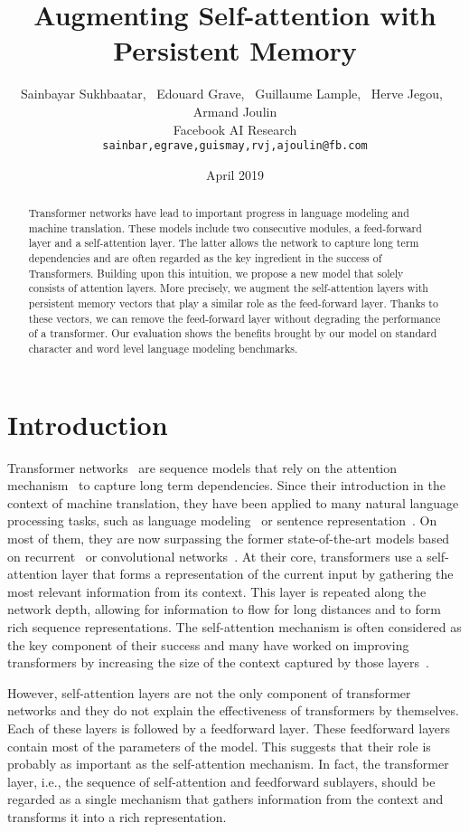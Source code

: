 \documentclass{article}
\title{Augmenting Self-attention with Persistent Memory}
\author{Sainbayar Sukhbaatar,~ Edouard Grave,~ Guillaume Lample,~ Herve Jegou,~ Armand Joulin\\
Facebook AI Research\\
\texttt{sainbar,egrave,guismay,rvj,ajoulin@fb.com}}
\date{April 2019}
\begin{document}
\maketitle

\begin{abstract}
Transformer networks have lead to important progress in language modeling and machine translation. These models include two consecutive modules, a feed-forward layer and a self-attention layer. The latter allows the network to capture long term dependencies and are often regarded as the key ingredient in the success of Transformers. Building upon this intuition, we propose a new model that solely consists of attention layers. More precisely, we augment the self-attention layers with persistent memory vectors that play a similar role as the feed-forward layer. Thanks to these vectors, we can remove the feed-forward layer without degrading the performance of a transformer. Our evaluation shows the benefits brought by our model on standard character and word level language modeling benchmarks.
\end{abstract}

\section{Introduction}
\label{sec:introduction}

Transformer networks~\cite{vaswani2017attention} are sequence models that rely on the attention mechanism~\cite{bahdanau2014neural} to capture long term dependencies.
Since their introduction in the context of machine translation, they have been applied to many natural language processing tasks, such as language modeling~\cite{al2018character} or sentence representation~\cite{devlin2018bert}.
On most of them, they are now surpassing the former state-of-the-art models based on recurrent~\cite{hochreiter1997long} or convolutional networks~\cite{dauphin2017language}.
At their core, transformers use a self-attention layer that forms a representation of the current input by gathering the most relevant information from its context.
This layer is repeated along the network depth, allowing for information to flow for long distances and to form rich sequence representations.
The self-attention mechanism is often considered as the key component of their success and many have worked on improving transformers by increasing the size of the context captured by those layers~\cite{wu2019pay,dai2019transformer,sukhbaatar2019adaptive}.

However, self-attention layers are not the only component of transformer networks and they do not
explain the effectiveness of transformers by themselves.
Each of these layers is followed by a feedforward layer. These feedforward layers contain most of the parameters of the model.
This suggests that their role is probably as important as the self-attention mechanism.
In fact, the transformer layer, i.e., the sequence of self-attention and feedforward sublayers, should be regarded as a single mechanism that gathers information from the context and transforms it into a rich representation.
\end{document}
